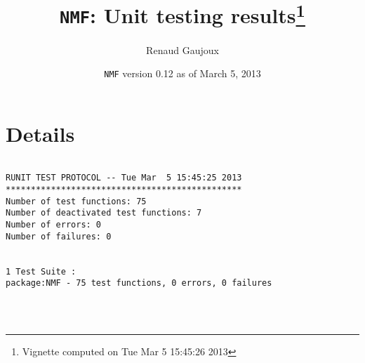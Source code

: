\documentclass[10pt]{article}
\author{Renaud Gaujoux}
\title{\texttt{NMF}: Unit testing results\footnote{Vignette computed  on Tue Mar  5 15:45:26 2013}}
\date{\texttt{NMF} version 0.12 as of March  5, 2013}
\begin{document}
\maketitle

\section{Details}
\begin{verbatim}

RUNIT TEST PROTOCOL -- Tue Mar  5 15:45:25 2013 
*********************************************** 
Number of test functions: 75 
Number of deactivated test functions: 7 
Number of errors: 0 
Number of failures: 0 

 
1 Test Suite : 
package:NMF - 75 test functions, 0 errors, 0 failures




\end{verbatim}
\end{document}
